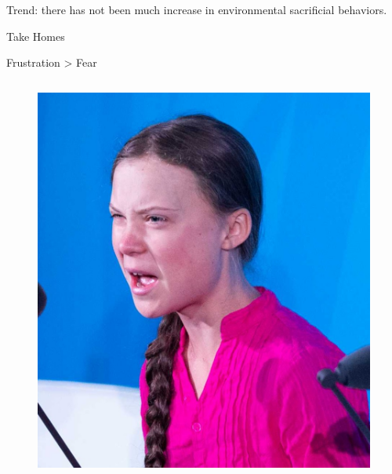 \documentclass{beamer}
\begin{document}
\begin{frame}{Trend: there has not been much increase in environmental sacrificial behaviors.}
\begin{frame}{Take Homes}
\begin{itemize}
    \pause
    
  \end{itemize}

\end{frame}

\begin{frame}{Frustration >  Fear}

\begin{columns}
\begin{figure}
\includegraphics[width=1.02\textwidth,height=1.02\textheight,keepaspectratio]{Figures/Greta.jpg}
\end{figure}



\end{columns}
\end{frame}
\end{frame}
\end{document}
